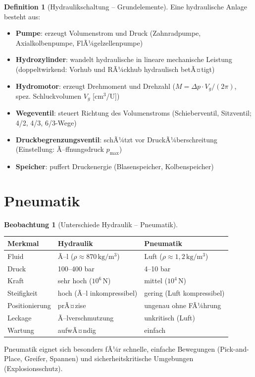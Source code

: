 ﻿\documentclass[a4paper,12pt]{report}
\theoremstyle{definition}
\newtheorem{definition}{Definition}
\newtheorem{beobachtung}{Beobachtung}
\begin{document}
\begin{definition}[Hydraulikschaltung -- Grundelemente]
Eine hydraulische Anlage besteht aus:
\begin{itemize}
    \item[-] \textbf{Pumpe}: erzeugt Volumenstrom und Druck
          (Zahnradpumpe, Axialkolbenpumpe, FlÃ¼gelzellenpumpe)
    \item[-] \textbf{Hydrozylinder}: wandelt hydraulische in lineare mechanische Leistung
          (doppeltwirkend: Vorhub und RÃ¼ckhub hydraulisch betÃ¤tigt)
    \item[-] \textbf{Hydromotor}: erzeugt Drehmoment und Drehzahl
          ($M = \Delta p \cdot V_g / (2\pi)$, spez. Schluckvolumen $V_g$ [cm$^3$/U])
    \item[-] \textbf{Wegeventil}: steuert Richtung des Volumenstroms
          (Schieberventil, Sitzventil; 4/2, 4/3, 6/3-Wege)
    \item[-] \textbf{Druckbegrenzungsventil}: schÃ¼tzt vor DruckÃ¼berschreitung
          (Einstellung: Ã–ffnungsdruck $p_{\max}$)
    \item[-] \textbf{Speicher}: puffert Druckenergie (Blasenspeicher, Kolbenspeicher)
\end{itemize}
\end{definition}

\section{Pneumatik}

\begin{beobachtung}[Unterschiede Hydraulik -- Pneumatik]
\begin{center}
\begin{tabular}{lll}
\toprule
Merkmal & Hydraulik & Pneumatik \\
\midrule
Fluid & Ã–l ($\rho \approx 870\,\mathrm{kg/m^3}$) & Luft ($\rho \approx 1{,}2\,\mathrm{kg/m^3}$) \\
Druck & 100--400 bar & 4--10 bar \\
Kraft & sehr hoch ($10^6\,\mathrm{N}$) & mittel ($10^4\,\mathrm{N}$) \\
Steifigkeit & hoch (Ã–l inkompressibel) & gering (Luft kompressibel) \\
Positionierung & prÃ¤zise & ungenau ohne FÃ¼hrung \\
Leckage & Ã–lverschmutzung & unkritisch (Luft) \\
Wartung & aufwÃ¤ndig & einfach \\
\bottomrule
\end{tabular}
\end{center}
Pneumatik eignet sich besonders fÃ¼r schnelle, einfache
Bewegungen (Pick-and-Place, Greifer, Spannen) und
sicherheitskritische Umgebungen (Explosionsschutz).
\end{beobachtung}
\end{document}
